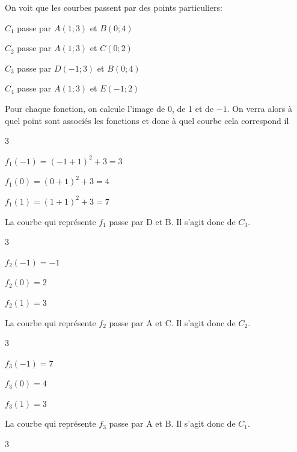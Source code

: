 \documentclass[11pt,a4paper]{article}  %
\begin{document}
\begin{corrBox}
	On voit que les courbes passent par des points particuliers:
	\begin{itemMet}
		\item $C_1$ passe par $A(1;3)$ et $B(0;4)$
		\item $C_2$ passe par $A(1;3)$ et $C(0;2)$
		\item $C_3$ passe par $D(-1;3)$ et $B(0;4)$
		\item $C_4$ passe par $A(1;3)$ et $E(-1;2)$
	\end{itemMet}
	
	Pour chaque fonction, on calcule l'image de 0, de 1 et de $-1$. On verra alors à quel point sont associés les fonctions et donc à quel courbe cela correspond il
	
	\begin{enumMet}
		\item 
		\begin{multicols}{3}
			\begin{itemMet}
			\item $f_1(-1)=(-1+1)^2+3=3$
			\item $f_1(0)=(0+1)^2+3=4$
			\item $f_1(1)=(1+1)^2+3=7$
		\end{itemMet}
		\end{multicols}
		La courbe qui représente $f_1$ passe par D et B. Il s'agit donc de $C_3$.
		\item 
		\begin{multicols}{3}
			\begin{itemMet}
				\item $f_2(-1)=-1$
				\item $f_2(0)=2$
				\item $f_2(1)=3$
			\end{itemMet}
		\end{multicols}
		La courbe qui représente $f_2$ passe par A et C. Il s'agit donc de $C_2$.
		\item 
		\begin{multicols}{3}
			\begin{itemMet}
				\item $f_3(-1)=7$
				\item $f_3(0)=4$
				\item $f_3(1)=3$
			\end{itemMet}
		\end{multicols}
		La courbe qui représente $f_3$ passe par A et B. Il s'agit donc de $C_1$.
		\item 
		\begin{multicols}{3}

\end{multicols}
\end{enumMet}
\end{corrBox}
\end{document}
